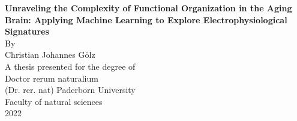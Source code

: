 \begin{titlepage}
    \begin{center}
        \vspace*{1cm}
        \LARGE
        \textbf{Unraveling the Complexity of Functional Organization in the Aging Brain: Applying Machine Learning to Explore Electrophysiological Signatures}\\
        \vspace{1.5cm}
        \Large
        By\\
        \vspace{0.5cm}
        Christian Johannes Gölz\\
        \vspace{0.5cm}       
        A thesis presented for the degree of\\
        Doctor rerum naturalium\\
        (Dr. rer. nat)
        \vfill
        \Large
        Paderborn University\\
        Faculty of natural sciences\\
        2022
            
    \end{center}
\end{titlepage}

